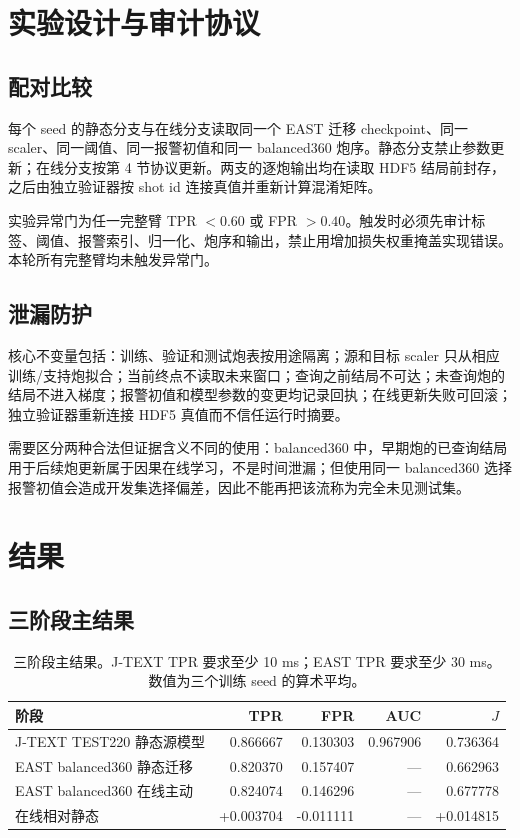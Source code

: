 \section{实验设计与审计协议}

\subsection{配对比较}

每个 seed 的静态分支与在线分支读取同一个 EAST 迁移 checkpoint、同一 scaler、同一阈值、同一报警初值和同一 balanced360 炮序。静态分支禁止参数更新；在线分支按第 4 节协议更新。两支的逐炮输出均在读取 HDF5 结局前封存，之后由独立验证器按 shot id 连接真值并重新计算混淆矩阵。

实验异常门为任一完整臂 TPR $<0.60$ 或 FPR $>0.40$。触发时必须先审计标签、阈值、报警索引、归一化、炮序和输出，禁止用增加损失权重掩盖实现错误。本轮所有完整臂均未触发异常门。

\subsection{泄漏防护}

核心不变量包括：训练、验证和测试炮表按用途隔离；源和目标 scaler 只从相应训练/支持炮拟合；当前终点不读取未来窗口；查询之前结局不可达；未查询炮的结局不进入梯度；报警初值和模型参数的变更均记录回执；在线更新失败可回滚；独立验证器重新连接 HDF5 真值而不信任运行时摘要。

需要区分两种合法但证据含义不同的使用：balanced360 中，早期炮的已查询结局用于后续炮更新属于因果在线学习，不是时间泄漏；但使用同一 balanced360 选择报警初值会造成开发集选择偏差，因此不能再把该流称为完全未见测试集。

\section{结果}

\subsection{三阶段主结果}

\begin{table}[H]
\centering
\caption{三阶段主结果。J-TEXT TPR 要求至少 10 ms；EAST TPR 要求至少 30 ms。数值为三个训练 seed 的算术平均。}
\label{tab:main-results}
\begin{tabular}{@{}lrrrr@{}}
\toprule
阶段 & TPR & FPR & AUC & $J$\\
\midrule
J-TEXT TEST220 静态源模型 & 0.866667 & 0.130303 & 0.967906 & 0.736364\\
EAST balanced360 静态迁移 & 0.820370 & 0.157407 & --- & 0.662963\\
EAST balanced360 在线主动 & 0.824074 & 0.146296 & --- & 0.677778\\
\midrule
在线相对静态 & +0.003704 & -0.011111 & --- & +0.014815\\
\bottomrule
\end{tabular}
\end{table}

